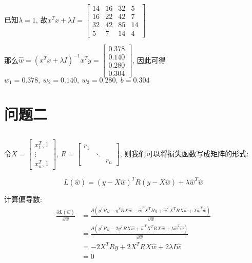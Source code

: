 \documentclass[12pt, a4paper]{article}
\begin{document}
\subsection{}

已知$\lambda = 1$, 故$x^Tx + \lambda I = \begin{bmatrix}
    14&16&32&5\\
    16&22&42&7\\
    32&42&85&14\\
    5&7&14&4
\end{bmatrix}$

那么$\hat{w} = (x^T x + \lambda I)^{-1}x^T y = \begin{bmatrix}
    0.378\\
    0.140\\
    0.280\\
    0.304
\end{bmatrix}$, 因此可得$w_1=0.378, \ w_2=0.140, \ w_3 = 0.280, \ b = 0.304$

\section{问题二}


\subsection{}

令$X = \begin{bmatrix}
    x_1^T, 1\\
    \vdots\\
    x_n^T, 1
\end{bmatrix}$, 
$R = \begin{bmatrix}
    r_1 &  & \\
    & \ddots & \\
    & & r_n
\end{bmatrix}$, 则我们可以将损失函数写成矩阵的形式:

\begin{equation*}
    L(\hat{w}) = (y - X \hat{w})^T R (y - X \hat{w}) + \lambda \hat{w}^T \hat{w}
\end{equation*}

计算偏导数:
\begin{align*}
    \frac{\partial L(\hat{w})}{\partial \hat{w}} &= \frac{\partial(y^T R y - y^T R X\hat{w}
    -\hat{w}^T X^T R y + \hat{w}^T X^T R X \hat{w}+\lambda \hat{w}^T \hat{w})}{\partial \hat{w}} \\
    &= \frac{\partial(y^T R y - 2 y^T R X\hat{w} + \hat{w}^T X^T R X \hat{w}
    +\lambda \hat{w}^T \hat{w})}{\partial \hat{w}} \\
    &= -2 X^T R y + 2 X^T R X \hat{w} + 2\lambda I \hat{w} \\
    &= 0
\end{align*}
\end{document}
